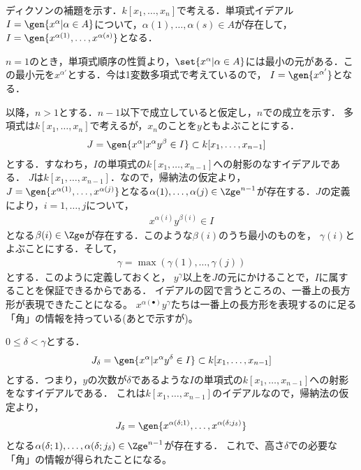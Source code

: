 ディクソンの補題を示す．$k[x_1,\dots,x_n]$で考える．単項式イデアル$I=\gen{x^{\alpha}|\alpha \in A}$について，$\alpha(1),\dots,\alpha(s)\in A$が存在して，$I=\gen{x^{\alpha(1)},\dots,x^{\alpha(s)}}$となる．
\begin{myproof}
$n=1$のとき，単項式順序の性質より，$\set{x^\alpha | \alpha \in A}$には最小の元がある．この最小元を$x^{\alpha'}$とする．今は1変数多項式で考えているので，
$I=\gen{x^{\alpha'}}$となる．

以降，$n>1$とする．$n-1$以下で成立していると仮定し，$n$での成立を示す．
多項式は$k[x_1,\dots,x_n]$で考えるが，$x_n$のことを$y$ともよぶことにする．
\begin{align}
 J &= \gen{x^\alpha | x^\alpha y^\beta \in I} \subset k[x_1,\dots,x_{n-1}]
\end{align}
とする．すなわち，$I$の単項式の$k[x_1,\dots,x_{n-1}]$への射影のなすイデアルである．
$J$は$k[x_1,\dots,x_{n-1}]$．なので，帰納法の仮定より，
$J=\gen{x^{\alpha(1)},\dots,x^{\alpha(j)}}$となる$\alpha(1),\dots,\alpha(j) \in \Zge^{n-1}$が存在する．$J$の定義により，$i=1,\dots,j$について，
\begin{align}
 x^{\alpha(i)}y^{\beta(i)} \in I
\end{align}
となる$\beta(i)\in \Zge$が存在する．このような$\beta(i)$のうち最小のものを，
$\gamma(i)$とよぶことにする．そして，
\begin{align}
 \gamma = \max(\gamma(1),\dots,\gamma(j))
\end{align}
とする．このように定義しておくと，
$y^\gamma$以上を$J$の元にかけることで，$I$に属することを保証できるからである．
イデアルの図で言うところの、一番上の長方形が表現できたことになる。
$x^{\alpha(\bullet)}y^\gamma$たちは一番上の長方形を表現するのに足る「角」の情報を持っている(あとで示すが)。

$0\le \delta < \gamma$とする．
\begin{align}
 J_{\delta} = \gen{x^\alpha | x^\alpha y^\delta \in I} \subset k[x_1,\dots,x_{n-1}]
\end{align}
とする．つまり，$y$の次数が$\delta$であるような$I$の単項式の$k[x_1,\dots,x_{n-1}]$への射影をなすイデアルである．
これは$k[x_1,\dots,x_{n-1}]$のイデアルなので，帰納法の仮定より，
\begin{align}
 J_\delta = \gen{x^{\alpha(\delta;1)},\dots,x^{\alpha(\delta;j_\delta)}}
\end{align}
となる$\alpha(\delta;1),\dots,\alpha(\delta;j_\delta) \in \Zge^{n-1}$が存在する．
これで、高さ$\delta$での必要な「角」の情報が得られたことになる。


\end{myproof}
